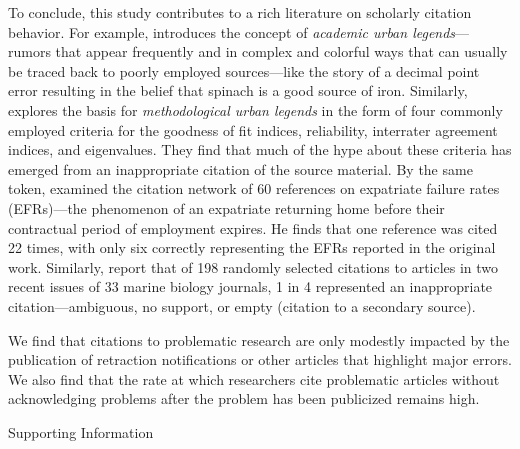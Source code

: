 \documentclass[12pt, letterpaper]{article}
\begin{document}
To conclude, this study contributes to a rich literature on scholarly citation behavior. For example, \citet{rekdal2014academic} introduces the concept of \textit{academic urban legends}--- rumors that appear frequently and in complex and colorful ways that can usually be traced back to poorly employed sources---like the story of a decimal point error resulting in the belief that spinach is a good source of iron. Similarly, \citet{lance2006sources} explores the basis for \textit{methodological urban legends} in the form of four commonly employed criteria for the goodness of fit indices, reliability, interrater agreement indices, and eigenvalues. They find that much of the hype about these criteria has emerged from an inappropriate citation of the source material. By the same token, \citet{harzing2002our} examined the citation network of 60 references on expatriate failure rates (EFRs)---the phenomenon of an expatriate returning home before their contractual period of employment expires. He finds that one reference was cited 22 times, with only six correctly representing the EFRs reported in the original work. Similarly, \citet{todd2010one} report that of 198 randomly selected citations to articles in two recent issues of 33 marine biology journals, 1 in 4 represented an inappropriate citation---ambiguous, no support, or empty (citation to a secondary source).

We find that citations to problematic research are only modestly impacted by the publication of retraction notifications or other articles that highlight major errors. We also find that the rate at which researchers cite problematic articles without acknowledging problems after the problem has been publicized remains high.  


\clearpage



\clearpage
\appendix
\renewcommand{\thesection}{SI \arabic{section}}
\renewcommand\thetable{\thesection.\arabic{table}}
\renewcommand\thefigure{\thesection.\arabic{figure}}
\setcounter{figure}{0}
\setcounter{section}{0}
\setcounter{table}{0}

\begin{center}
\Large{Supporting Information}
\end{center}
\end{document}

